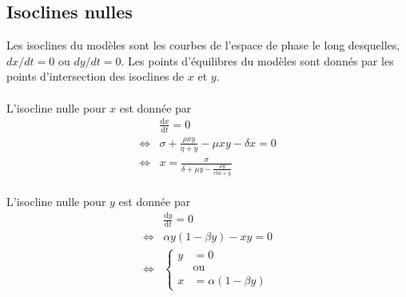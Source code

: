 \documentclass[12pt]{article}
\newcommand{\equ}{\Longleftrightarrow{}}
\newcommand{\deriv}{\mathrm{d}}
\newcommand{\dt}[1]{\frac{\deriv #1}{\deriv t}}
\begin{document}
\subsection{Isoclines nulles}
Les isoclines du modèles sont les courbes de l'espace de phase le long desquelles, $dx/dt =0$ ou $dy/dt = 0$. Les points d'équilibres du modèles sont donnés par les points d'intersection des isoclines de $x$ et $y$.

\paragraph{}L'isocline nulle pour $x$ est donnée par
\begin{align*}
    &\dt{x} =0 \\
    \equ &\sigma + \frac{\rho xy}{\eta+y}-\mu xy -\delta x =0\\
    \equ &x = \frac{\sigma}{\delta + \mu y - \frac{\rho y}{eta+y}}
\end{align*}

\paragraph{}L'isocline nulle pour $y$ est donnée par
\begin{align*}
    &\dt{y} =0 \\
    \equ &\alpha y \left(1-\beta y \right) -xy =0\\
    \equ &\left\{\begin{aligned}
        y&=0\\
       &\text{ou}\\
       x &= \alpha \left(1-\beta y\right)
    \end{aligned}\right.
\end{align*}
\end{document}
